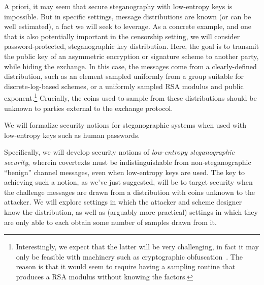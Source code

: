 A priori, it may seem that secure steganography with
low-entropy keys is impossible.  But in specific settings,
message distributions are known (or can be well estimated), a fact we will seek to 
leverage.  As a concrete example, and one that is also
potentially important in the censorship setting, we will consider
password-protected, steganographic key distribution.  Here, 
the goal is to transmit the public key of
an asymmetric encryption or signature scheme to another party, while
hiding the exchange.  In this case, the messages 
come from a clearly-defined distribution, such as an element sampled uniformly
from a group suitable for discrete-log-based schemes, or a uniformly sampled RSA modulus and public
exponent.\footnote{Interestingly, we expect that the latter will be very
challenging, in fact it may only be feasible with machinery such as cryptographic
obfuscation~\cite{garg2013candidate}. The reason is that it would seem to require
having a sampling routine that produces a RSA modulus without knowing the
factors.} Crucially, the coins used to sample from these
distributions should be unknown to parties external to the exchange protocol.


\begin{task}
\label{task:pwstego-defs}
We will formalize security notions for steganographic systems when used with
low-entropy keys such as human passwords. 
\end{task}

Specifically, we will develop security notions of \textit{low-entropy steganographic
  security}, wherein covertexts must be indistinguishable from
non-steganographic ``benign'' channel messages, even when low-entropy keys are used.
The key to achieving such a notion, as we've just suggested, 
will be to target security when the challenge messages are 
drawn from a distribution with coins unknown to the attacker.  
We will explore settings in which the attacker and scheme designer
know the distribution, as well as (arguably more practical) 
settings in which they are only able to each obtain some number of samples drawn
from it. 


